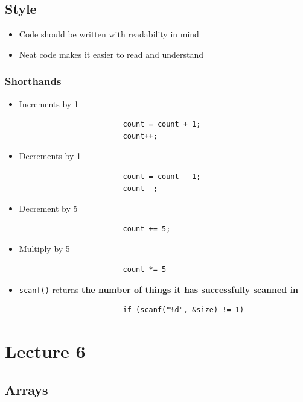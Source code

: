 \documentclass{article}
\begin{document}
	\subsection{Style}

		\begin{itemize}
			\item Code should be written with readability in mind
			\item Neat code makes it easier to read and understand
		\end{itemize}

		\subsubsection{Shorthands}
		
			\begin{itemize}
				\item Increments by 1
					\begin{verbatim}
						count = count + 1;
						count++;
					\end{verbatim}
				\item Decrements by 1
					\begin{verbatim}
						count = count - 1;
						count--;
					\end{verbatim}
				\item Decrement by 5
					\begin{verbatim}
						count += 5;
					\end{verbatim}
				\item Multiply by 5
					\begin{verbatim}
						count *= 5
					\end{verbatim}
				\item \texttt{scanf()} returns \textbf{the number of things it has successfully scanned in}
					\begin{verbatim}
						if (scanf("%d", &size) != 1)
					\end{verbatim}
			\end{itemize}

\newpage

\section{Lecture 6}
	
	\subsection{Arrays}
\end{document}
